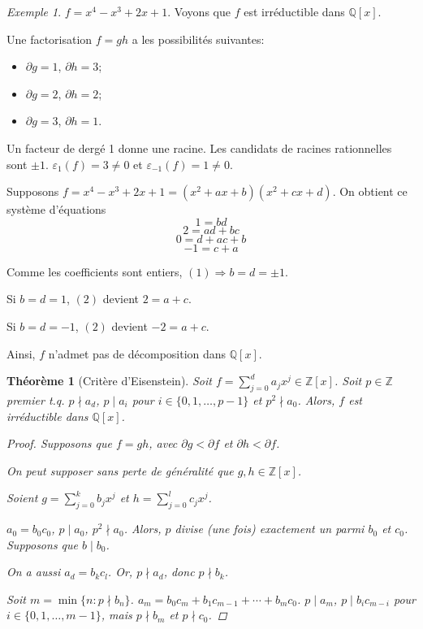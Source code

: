 \documentclass{report}
\newtheorem*{thm}{Th\'eor\`eme}
\theoremstyle{definition}
\theoremstyle{remark}
\newtheorem*{exem}{Exemple}
\def\ZZ{\mathbb{Z}}
\def\QQ{\mathbb{Q}}
\begin{document}
	\begin{exem}
		$f=x^4-x^3+2x+1$. Voyons que $f$ est irr\'eductible dans $\QQ[x]$.

		Une factorisation $f=gh$ a les possibilit\'es suivantes:
		\begin{itemize}
			\item $\partial g=1$, $\partial h=3$;
			\item $\partial g=2$, $\partial h=2$;
			\item $\partial g=3$, $\partial h=1$.
		\end{itemize}

		Un facteur de derg\'e 1 donne une racine. Les candidats de racines rationnelles sont $\pm1$. $\varepsilon_1(f)=3\neq0$ et $\varepsilon_{-1}(f)=1\neq0$.

		Supposons $f = x^4-x^3+2x+1 = (x^2+ax+b) (x^2+cx+d)$. On obtient ce syst\`eme d'\'equations
		\begin{equation*}
			1=bd
			\tag{1}
		\end{equation*}
		\begin{equation*}
			2=ad+bc
			\tag{2}
		\end{equation*}
		\begin{equation*}
			0=d+ac+b
			\tag{3}
		\end{equation*}
		\begin{equation*}
			-1=c+a
			\tag{4}
		\end{equation*}

		Comme les coefficients sont entiers, $(1) \Longrightarrow b=d=\pm1$.

		Si $b=d=1$, $(2)$ devient $2=a+c$. \lightning

		Si $b=d=-1$, $(2)$ devient $-2=a+c$. \lightning

		Ainsi, $f$ n'admet pas de d\'ecomposition dans $\QQ[x]$.
	\end{exem}

	\begin{thm}[Crit\`ere d'Eisenstein]
		Soit $f=\sum_{j=0}^{d}a_jx^j\in\ZZ[x]$. Soit $p\in\ZZ$ premier t.q. $p\nmid a_d$, $p\mid a_i$ pour $i\in\{0,1,\dots,p-1\}$ et $p^2\nmid a_0$. Alors, $f$ est irr\'eductible dans $\QQ[x]$.

		\begin{proof}
			Supposons que $f=gh$, avec $\partial g<\partial f$ et $\partial h<\partial f$.

			On peut supposer sans perte de g\'en\'eralit\'e que $g,h\in\ZZ[x]$.

			Soient $g=\sum_{j=0}^{k}b_jx^j$ et $h=\sum_{j=0}^{l}c_jx^j$.

			$a_0=b_0c_0$, $p\mid a_0$, $p^2\nmid a_0$. Alors, $p$ divise (une fois) exactement un parmi $b_0$ et $c_0$. Supposons que $b\mid b_0$.

			On a aussi $a_d=b_kc_l$. Or, $p\nmid a_d$, donc $p\nmid b_k$.

			Soit $m=\min\{n : p\nmid b_n\}$. $a_m = b_0c_m + b_1c_{m-1} + \cdots + b_mc_0$. $p\mid a_m$, $p\mid b_ic_{m-i}$ pour $i\in\{0,1,\dots,m-1\}$, mais $p\nmid b_m$ et $p\nmid c_0$. \lightning
		\end{proof}
	\end{thm}
\end{document}
